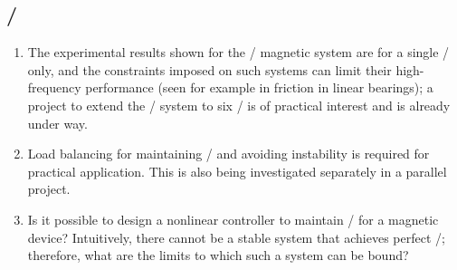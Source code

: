 \documentclass[11pt,a4paper]{memoir}
\begin{document}
\subsection{\QZS/}

\begin{enumerate}
\item
The experimental results shown for the \qzs/ magnetic system are for a single \dof/ only, and the constraints imposed on such systems can limit their high-frequency performance (seen for example in friction in linear bearings); a project to extend the \qzs/ system to six \dofs/ is of practical interest and is already under way.

\item
Load balancing for maintaining \qzs/ and avoiding instability is required for practical application.
This is also being investigated separately in a parallel project.

\item
Is it possible to design a nonlinear controller to maintain \qzs/ for a magnetic device?
Intuitively, there cannot be a stable system that achieves perfect \qzs/; therefore, what are the limits to which such a system can be bound?
\end{enumerate}
\end{document}
